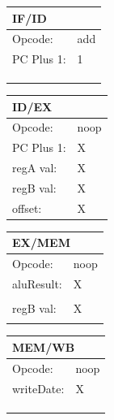 \documentclass[12pt, letterpaper]{article}
\begin{document}
\begin{table}[H]
    \begin{tabular}{|ll|}
    \hline
    \multicolumn{2}{|l|}{IF/ID}            \\ \hline
    \multicolumn{1}{|l|}{Opcode:}    & add \\ \hline
    \multicolumn{1}{|l|}{PC Plus 1:} & 1   \\ \hline
    \multicolumn{1}{|l|}{}           &     \\ \hline
    \multicolumn{1}{|l|}{}           &     \\ \hline
    \multicolumn{1}{|l|}{}           &     \\ \hline
    \end{tabular}
    \begin{tabular}{|ll|}
    \hline
    \multicolumn{2}{|l|}{ID/EX}             \\ \hline
    \multicolumn{1}{|l|}{Opcode:}    & noop \\ \hline
    \multicolumn{1}{|l|}{PC Plus 1:} & X    \\ \hline
    \multicolumn{1}{|l|}{regA val:}  & X    \\ \hline
    \multicolumn{1}{|l|}{regB val:}  & X    \\ \hline
    \multicolumn{1}{|l|}{offset:}    & X    \\ \hline
    \end{tabular}
    \begin{tabular}{|ll|}
    \hline
    \multicolumn{2}{|l|}{EX/MEM}            \\ \hline
    \multicolumn{1}{|l|}{Opcode:}    & noop \\ \hline
    \multicolumn{1}{|l|}{aluResult:} & X    \\ \hline
    \multicolumn{1}{|l|}{}           &      \\ \hline
    \multicolumn{1}{|l|}{regB val:}  & X    \\ \hline
    \multicolumn{1}{|l|}{}           &      \\ \hline
    \end{tabular}
    \begin{tabular}{|ll|}
    \hline
    \multicolumn{2}{|l|}{MEM/WB}            \\ \hline
    \multicolumn{1}{|l|}{Opcode:}    & noop \\ \hline
    \multicolumn{1}{|l|}{writeDate:} & X    \\ \hline
    \multicolumn{1}{|l|}{}           &      \\ \hline
    \multicolumn{1}{|l|}{}           &      \\ \hline
    \multicolumn{1}{|l|}{}           &      \\ \hline
    \end{tabular}
\end{table}
\end{document}
